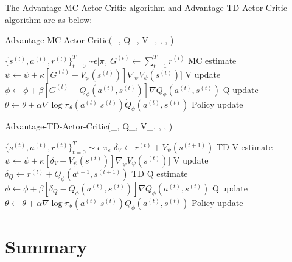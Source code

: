 \documentclass[11pt]{article}
\begin{document}
The Advantage-MC-Actor-Critic algorithm and Advantage-TD-Actor-Critic algorithm are as below:
\begin{algorithm}[H]
\caption{Advantage-MC-Actor-Critic(\pi_{\epsilon}, Q_\phi, V_\psi, \alpha, \beta, \kappa)}
\label{algo:qmc-ac}
\begin{algorithmic}[1]
\STATE $\{ s^{(t)}, a^{(t)}, r^{(t)} \}_{t=0}^T$ \sim $\mathcal{\epsilon} | \pi_{\epsilon}$ 
\STATE $G^{(t)} \leftarrow \sum_{t=1}^T r^{(i)}$ \hfill MC estimate
\STATE $\psi \leftarrow \psi + \kappa[G^{(t)} - V_\psi (s^{(t)})] \nabla_\psi V_\psi(s^{(t)})]$ \hfill V update
\STATE $\phi \leftarrow \phi + \beta[G^{(t)} - Q_\phi (a^{(t)}, s^{(t)})]\nabla Q_\phi (a^{(t)}, s^{(t)})$ \hfill Q update
\STATE $\theta \leftarrow \theta + \alpha \nabla \log \pi_\theta (a^{(t)} | s^{(t)}) \dot Q_\phi (a^{(t)}, s^{(t)})$ \hfill Policy update

\ENDFOR
\ENDFOR
\end{algorithmic}
\end{algorithm}
\begin{algorithm}[H]
\caption{Advantage-TD-Actor-Critic(\pi_{\epsilon}, Q_\phi, V_\psi, \alpha, \beta, \kappa)}
\label{algo:qtd-ac}
\begin{algorithmic}[1]
\STATE $\{ s^{(t)}, a^{(t)}, r^{(t)} \}_{t=0}^T \sim \mathcal{\epsilon} | \pi_{\epsilon}$ 
\STATE $\delta_V \leftarrow r^{(t)} + V_\psi (s^{(t+1)})$ \hfill TD V estimate
\STATE $\psi \leftarrow \psi + \kappa[\delta_V - V_\psi (s^{(t)})] \nabla_\psi V_\psi(s^{(t)})]$ \hfill V update
\STATE $\delta_Q \leftarrow r^{(t)} + Q_\phi (a^{t+1}, s^{(t+1)})$ \hfill TD Q estimate
\STATE $\phi \leftarrow \phi + \beta[\delta_Q - Q_\phi (a^{(t)}, s^{(t)})]\nabla Q_\phi (a^{(t)}, s^{(t)})$ \hfill Q update
\STATE $\theta \leftarrow \theta + \alpha \nabla \log \pi_\theta (a^{(t)} | s^{(t)}) \dot Q_\phi (a^{(t)}, s^{(t)})$ \hfill Policy update

\ENDFOR
\ENDFOR
\end{algorithmic}
\end{algorithm}














\newpage

\section{Summary}
\end{document}
